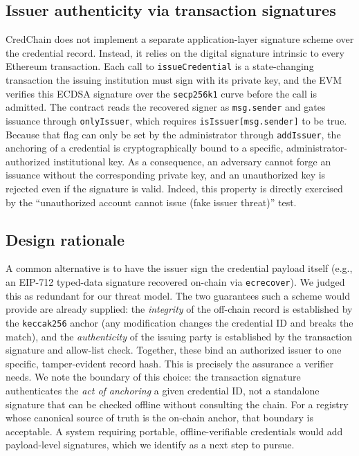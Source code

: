 \documentclass[conference]{IEEEtran}
\begin{document}
\subsection{Issuer authenticity via transaction signatures}
CredChain does not implement a separate application-layer signature scheme over the credential record. Instead, it relies on the digital signature intrinsic to every Ethereum transaction. Each call to \texttt{issueCredential} is a state-changing transaction the issuing institution must sign with its private key, and the EVM verifies this ECDSA signature over the \verb|secp256k1| curve before the call is admitted. The contract reads the recovered signer as \texttt{msg.sender} and gates issuance through \texttt{onlyIssuer}, which requires \texttt{isIssuer[msg.sender]} to be true. Because that flag can only be set by the administrator through \texttt{addIssuer}, the anchoring of a credential is cryptographically bound to a specific, administrator-authorized institutional key. As a consequence, an adversary cannot forge an issuance without the corresponding private key, and an unauthorized key is rejected even if the signature is valid. Indeed, this property is directly exercised by the ``unauthorized account cannot issue (fake issuer threat)'' test.

\subsection{Design rationale}
A common alternative is to have the issuer sign the credential payload itself (e.g., an EIP-712 typed-data signature recovered on-chain via \texttt{ecrecover}). We judged this as redundant for our threat model. The two guarantees such a scheme would provide are already supplied: the \emph{integrity} of the off-chain record is established by the \verb|keccak256| anchor (any modification changes the credential ID and breaks the match), and the \emph{authenticity} of the issuing party is established by the transaction signature and allow-list check. Together, these bind an authorized issuer to one specific, tamper-evident record hash. This is precisely the assurance a verifier needs. We note the boundary of this choice: the transaction signature authenticates the \emph{act of anchoring} a given credential ID, not a standalone signature that can be checked offline without consulting the chain. For a registry whose canonical source of truth is the on-chain anchor, that boundary is acceptable. A system requiring portable, offline-verifiable credentials would add payload-level signatures, which we identify as a next step to pursue.
\end{document}
